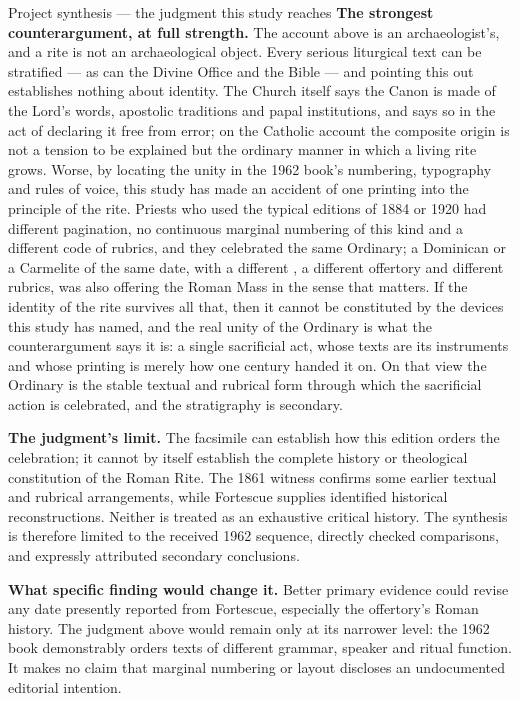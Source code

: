 \begin{studybox}{Project synthesis --- the judgment this study reaches}
\smallskip
\textbf{The strongest counterargument, at full strength.} The account above is
an archaeologist's, and a rite is not an archaeological object. Every serious
liturgical text can be stratified --- as can the Divine Office and the Bible
--- and pointing this out establishes nothing about
identity. The Church itself says the Canon is made of the Lord's words,
apostolic traditions and papal institutions, and says so in the act of
declaring it free from error; on the Catholic account the composite origin is
not a tension to be explained but the ordinary manner in which a living rite
grows. Worse, by locating the unity in the 1962 book's numbering, typography
and rules of voice, this study has made an accident of one printing into the
principle of the rite. Priests who used the typical editions of 1884 or 1920
had different pagination, no continuous marginal numbering of this kind and a
different code of rubrics, and they celebrated the same Ordinary; a Dominican
or a Carmelite of the same date, with a different , a
different offertory and different rubrics, was also offering the Roman Mass in
the sense that matters. If the identity of the rite survives all that, then it
cannot be constituted by the devices this study has named, and the real unity
of the Ordinary is what the counterargument says it is: a single sacrificial
act, whose texts are its instruments and whose printing is merely how one
century handed it on. On that view the Ordinary is the stable textual and
rubrical form through which the sacrificial action is celebrated, and the
stratigraphy is secondary.

\smallskip
\textbf{The judgment's limit.} The facsimile can establish how this edition
orders the celebration; it cannot by itself establish the complete history or
theological constitution of the Roman Rite. The 1861 witness confirms some
earlier textual and rubrical arrangements, while Fortescue supplies identified
historical reconstructions. Neither is treated as an exhaustive critical
history. The synthesis is therefore limited to the received 1962 sequence,
directly checked comparisons, and expressly attributed secondary conclusions.

\smallskip
\textbf{What specific finding would change it.} Better primary evidence could
revise any date presently reported from Fortescue, especially the offertory's
Roman history. The judgment above would remain only at its narrower level:
the 1962 book demonstrably orders texts of different grammar, speaker and
ritual function. It makes no claim that marginal numbering or layout discloses
an undocumented editorial intention.


\end{studybox}

